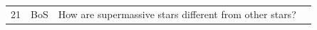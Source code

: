 \documentclass[10pt]{article}
\begin{document}
\begin{tiny}
\begin{longtable}{r p{0.3in} p{1.212in} p{3.8in}}
    21 &          BoS &                                                                                                                                                                                                                           How are supermassive stars different from other stars? &                                                                                                                                                                                                                                                                                                                                                                                                                                                                                                                                                                                                                                                                                                                                                                                                                                                                                                                                                                                                                                                                                                                                                                                                                                                                                                                                                                                                                                                                                                                                                                                                                                                                                                                                                                                                                                                                                                                                                                                                                                                                                                                                                                                                                                                                                                                                                                                                                                                                                                                                                                                                                                                                                                                                                                                                                                                                                                                                                                                                                                                                                               
\end{longtable}
\end{tiny}
\end{document}
